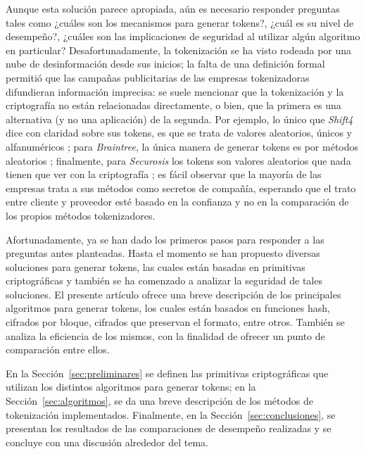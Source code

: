 \documentclass[conference]{IEEEtran}
\begin{document}
  Aunque esta solución parece apropiada, aún es necesario responder preguntas
  tales como ¿cuáles son los mecanismos para generar tokens?, ¿cuál es su nivel
  de desempeño?, ¿cuáles son las implicaciones de seguridad al utilizar algún
  algoritmo en particular? Desafortunadamente, la tokenización se ha visto
  rodeada por una nube de desinformación desde sus inicios; la falta de una
  definición formal permitió que las campañas publicitarias de las empresas
  tokenizadoras difundieran información imprecisa: se suele mencionar que la
  tokenización y la criptografía no están relacionadas directamente, o bien, que
  la primera es una alternativa (y no una aplicación) de la segunda. Por
  ejemplo, lo único que \textit{Shift4} dice con claridad sobre sus tokens, es
  que se trata de valores aleatorios, únicos y alfanuméricos \cite{shif4_uno};
  para \textit{Braintree}, la única manera de generar tokens es por métodos
  aleatorios \cite{braintree_uno}; finalmente, para \textit{Securosis} los
  tokens son valores aleatorios que nada tienen que ver con la criptografía
  \cite{securosis}; es fácil observar que la mayoría de las empresas trata a sus
  métodos como secretos de compañía, esperando que el trato entre cliente y
  proveedor esté basado en la confianza y no en la comparación de los propios
  métodos tokenizadores.

  Afortunadamente, ya se han dado los primeros pasos para responder a las
  preguntas antes planteadas. Hasta el momento se han propuesto diversas
  soluciones para generar tokens, las cuales están basadas en primitivas
  criptográficas y también se ha comenzado a analizar la seguridad de tales
  soluciones. El presente artículo ofrece una breve descripción de los
  principales algoritmos para generar tokens, los cuales están basados en
  funciones hash, cifrados por bloque, cifrados que preservan el formato, entre
  otros. También se analiza la eficiencia de los mismos, con la finalidad de
  ofrecer un punto de comparación entre ellos.

  En la Sección~\ref{sec:preliminares} se definen las primitivas criptográficas
  que utilizan los distintos algoritmos para generar tokens; en la
  Sección~\ref{sec:algoritmos}, se da una breve descripción de los métodos de
  tokenización implementados. Finalmente, en la Sección~\ref{sec:conclusiones},
  se presentan los resultados de las comparaciones de desempeño realizadas y se
  concluye con una discusión alrededor del tema.
\end{document}
